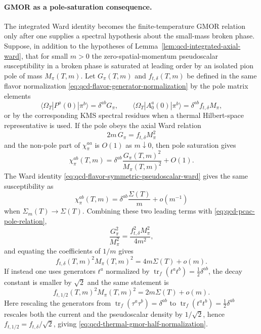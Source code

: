 \paragraph{GMOR as a pole-saturation consequence.}
The integrated Ward identity becomes the finite-temperature GMOR relation
only after one supplies a spectral hypothesis about the small-mass broken
phase.  Suppose, in addition to the hypotheses of
Lemma~\ref{lem:qcd-integrated-axial-ward}, that for small \(m>0\) the
zero-spatial-momentum pseudoscalar susceptibility in a broken phase is
saturated at leading order by an isolated pion pole of mass \(M_\pi(T,m)\).
Let \(G_\pi(T,m)\) and \(f_{t,\delta}(T,m)\) be defined in the same flavor
normalization \eqref{eq:qcd-flavor-generator-normalization} by the pole
matrix elements
\[
  \langle\Omega_T|P^a(0)|\pi^b\rangle
  =
  \delta^{ab}G_\pi,
  \qquad
  \langle\Omega_T|A_0^a(0)|\pi^b\rangle
  =
  \delta^{ab}f_{t,\delta}M_\pi,
\]
or by the corresponding KMS spectral residues when a thermal Hilbert-space
representative is used.  If the pole obeys the axial Ward relation
\begin{equation}
  2m\,G_\pi=f_{t,\delta}M_\pi^2
  \label{eq:qcd-pcac-pole-relation}
\end{equation}
and the non-pole part of \(\chi_\pi^{aa}\) is \(O(1)\) as
\(m\downarrow0\), then pole saturation gives
\[
  \chi_\pi^{ab}(T,m)
  =
  \delta^{ab}\frac{G_\pi(T,m)^2}{M_\pi(T,m)^2}+O(1).
\]
The Ward identity \eqref{eq:qcd-flavor-symmetric-pseudoscalar-ward} gives the
same susceptibility as
\[
  \chi_\pi^{ab}(T,m)
  =
  \delta^{ab}\frac{\Sigma(T)}{m}+o(m^{-1})
\]
when \(\Sigma_m(T)\to\Sigma(T)\).  Combining these two leading terms with
\eqref{eq:qcd-pcac-pole-relation},
\[
  \frac{G_\pi^2}{M_\pi^2}
  =
  \frac{f_{t,\delta}^2M_\pi^2}{4m^2},
\]
and equating the coefficients of \(1/m\) gives
\begin{equation}
  f_{t,\delta}(T,m)^2M_\pi(T,m)^2
  =
  4m\Sigma(T)+o(m).
  \label{eq:qcd-thermal-gmor-delta-normalization}
\end{equation}
If instead one uses generators \(t^a\) normalized by
\(\operatorname{tr}_{f}(t^at^b)=\frac12\delta^{ab}\), the decay constant is
smaller by \(\sqrt2\) and the same statement is
\begin{equation}
  f_{t,1/2}(T,m)^2M_\pi(T,m)^2
  =
  2m\Sigma(T)+o(m).
  \label{eq:qcd-thermal-gmor-half-normalization}
\end{equation}
Here rescaling the generators from
\(\operatorname{tr}_f(\tau^a\tau^b)=\delta^{ab}\) to
\(\operatorname{tr}_f(t^at^b)=\frac12\delta^{ab}\) rescales both the current
and the pseudoscalar density by \(1/\sqrt2\), hence
\(f_{t,1/2}=f_{t,\delta}/\sqrt2\), giving
\eqref{eq:qcd-thermal-gmor-half-normalization}.


